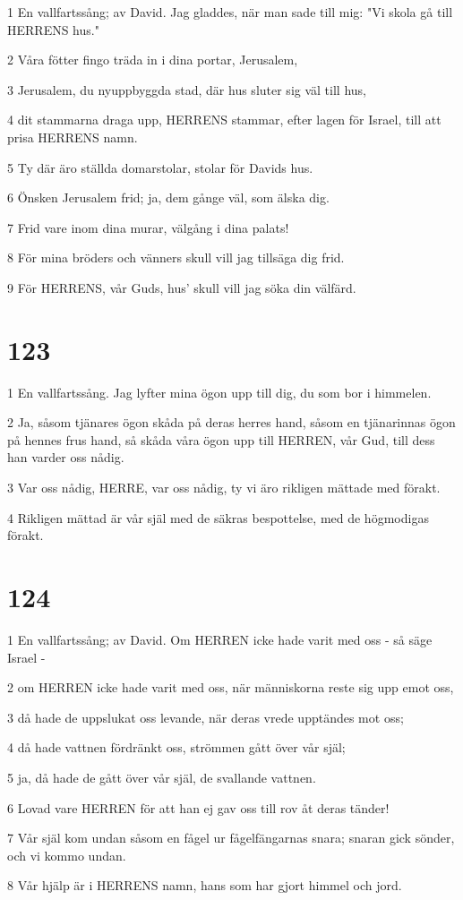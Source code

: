 \par 1 En vallfartssång; av David. Jag gladdes, när man sade till mig: "Vi skola gå till HERRENS hus."
\par 2 Våra fötter fingo träda in i dina portar, Jerusalem,
\par 3 Jerusalem, du nyuppbyggda stad, där hus sluter sig väl till hus,
\par 4 dit stammarna draga upp, HERRENS stammar, efter lagen för Israel, till att prisa HERRENS namn.
\par 5 Ty där äro ställda domarstolar, stolar för Davids hus.
\par 6 Önsken Jerusalem frid; ja, dem gånge väl, som älska dig.
\par 7 Frid vare inom dina murar, välgång i dina palats!
\par 8 För mina bröders och vänners skull vill jag tillsäga dig frid.
\par 9 För HERRENS, vår Guds, hus' skull vill jag söka din välfärd.

\chapter{123}

\par 1 En vallfartssång. Jag lyfter mina ögon upp till dig, du som bor i himmelen.
\par 2 Ja, såsom tjänares ögon skåda på deras herres hand, såsom en tjänarinnas ögon på hennes frus hand, så skåda våra ögon upp till HERREN, vår Gud, till dess han varder oss nådig.
\par 3 Var oss nådig, HERRE, var oss nådig, ty vi äro rikligen mättade med förakt.
\par 4 Rikligen mättad är vår själ med de säkras bespottelse, med de högmodigas förakt.

\chapter{124}

\par 1 En vallfartssång; av David. Om HERREN icke hade varit med oss - så säge Israel -
\par 2 om HERREN icke hade varit med oss, när människorna reste sig upp emot oss,
\par 3 då hade de uppslukat oss levande, när deras vrede upptändes mot oss;
\par 4 då hade vattnen fördränkt oss, strömmen gått över vår själ;
\par 5 ja, då hade de gått över vår själ, de svallande vattnen.
\par 6 Lovad vare HERREN för att han ej gav oss till rov åt deras tänder!
\par 7 Vår själ kom undan såsom en fågel ur fågelfängarnas snara; snaran gick sönder, och vi kommo undan.
\par 8 Vår hjälp är i HERRENS namn, hans som har gjort himmel och jord.

